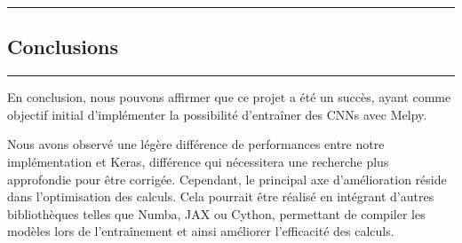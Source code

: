 {\color{gray}\hrule}
\begin{center}
\section{Conclusions}
\bigskip
\end{center}
{\color{gray}\hrule}
\vspace{0.5cm}

En conclusion, nous pouvons affirmer que ce projet a été un succès, ayant comme objectif initial d’implémenter 
la possibilité d’entraîner des CNNs avec Melpy. 

Nous avons observé une légère différence de performances 
entre notre implémentation et Keras, différence qui nécessitera une recherche plus approfondie pour être corrigée. 
Cependant, le principal axe d’amélioration réside dans l’optimisation des calculs. Cela pourrait être réalisé 
en intégrant d’autres bibliothèques telles que Numba, JAX ou Cython, permettant de compiler les modèles lors 
de l’entraînement et ainsi améliorer l’efficacité des calculs. \\